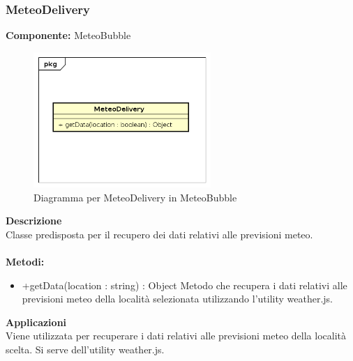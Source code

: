 \subsubsection{MeteoDelivery}
\textbf{Componente:}  MeteoBubble\\
   \FloatBarrier
   \begin{figure}[ht]
   \centering
   \includegraphics[width=0.6\textwidth]{img/single-MeteoDelivery}
   \caption{{Diagramma per MeteoDelivery in MeteoBubble}}
\end{figure}
\FloatBarrier
\textbf{Descrizione}\\
Classe predisposta per il recupero dei dati relativi alle previsioni meteo.
\\
\\
\textbf{Metodi:} 
\begin{itemize}
\item +getData(location : string) : Object
Metodo che recupera i dati relativi alle previsioni meteo della località selezionata utilizzando l'utility weather.js.

\end{itemize} 


\textbf{Applicazioni}\\
Viene utilizzata per recuperare i dati relativi alle previsioni meteo della località scelta. Si serve dell'utility weather.js. 


\clearpage

